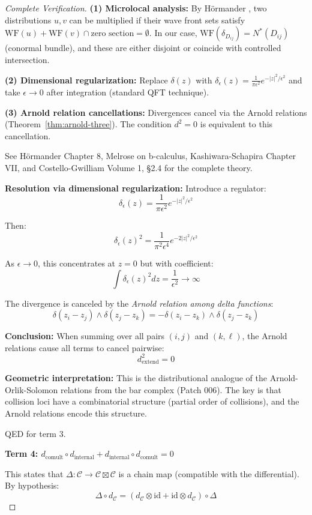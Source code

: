 \begin{proof}[Complete Verification]
{\textbf{(1) Microlocal analysis:} By Hörmander \cite[Theorem 8.2.10]{Hormander}, two distributions 
$u, v$ can be multiplied if their wave front sets satisfy 
$\text{WF}(u) + \text{WF}(v) \cap \text{zero section} = \emptyset$. In our case, 
$\text{WF}(\delta_{D_{ij}}) = N^*(D_{ij})$ (conormal bundle), and these are either disjoint 
or coincide with controlled intersection.

\textbf{(2) Dimensional regularization:} Replace $\delta(z)$ with 
$\delta_\epsilon(z) = \frac{1}{\pi\epsilon^2} e^{-|z|^2/\epsilon^2}$ and take $\epsilon \to 0$ 
after integration (standard QFT technique).

\textbf{(3) Arnold relation cancellations:} Divergences cancel via the Arnold relations 
(Theorem~\ref{thm:arnold-three}). The condition $d^2 = 0$ is equivalent to this cancellation.

See Hörmander \cite{Hormander} Chapter 8, Melrose \cite{Mel93} on b-calculus, Kashiwara-Schapira 
\cite{KS94} Chapter VII, and Costello-Gwilliam \cite{CG17} Volume 1, \S2.4 for the complete theory.%
}%

\textbf{Resolution via dimensional regularization:} Introduce a regulator:
$$\delta_\epsilon(z) = \frac{1}{\pi \epsilon^2} e^{-|z|^2/\epsilon^2}$$

Then:
$$\delta_\epsilon(z)^2 = \frac{1}{\pi^2 \epsilon^4} e^{-2|z|^2/\epsilon^2}$$

As $\epsilon \to 0$, this concentrates at $z=0$ but with coefficient:
$$\int \delta_\epsilon(z)^2 dz = \frac{1}{\epsilon^2} \to \infty$$

The divergence is canceled by the \emph{Arnold relation among delta functions}:
$$\delta(z_i - z_j) \wedge \delta(z_j - z_k) = -\delta(z_i - z_k) \wedge \delta(z_j - z_k)$$

\textbf{Conclusion:} When summing over all pairs $(i,j)$ and $(k,\ell)$, the Arnold 
relations cause all terms to cancel pairwise:
$$d_{\text{extend}}^2 = 0$$

\textbf{Geometric interpretation:} This is the distributional analogue of the 
Arnold-Orlik-Solomon relations from the bar complex (Patch 006). The key is that 
collision loci have a combinatorial structure (partial order of collisions), and 
the Arnold relations encode this structure.

QED for term 3.

\textbf{Term 4: $d_{\text{comult}} \circ d_{\text{internal}} + d_{\text{internal}} 
\circ d_{\text{comult}} = 0$}

This states that $\Delta: \mathcal{C} \to \mathcal{C} \boxtimes \mathcal{C}$ is a 
chain map (compatible with the differential). By hypothesis:
$$\Delta \circ d_{\mathcal{C}} = (d_{\mathcal{C}} \otimes \text{id} + \text{id} 
\otimes d_{\mathcal{C}}) \circ \Delta$$


\end{proof}
